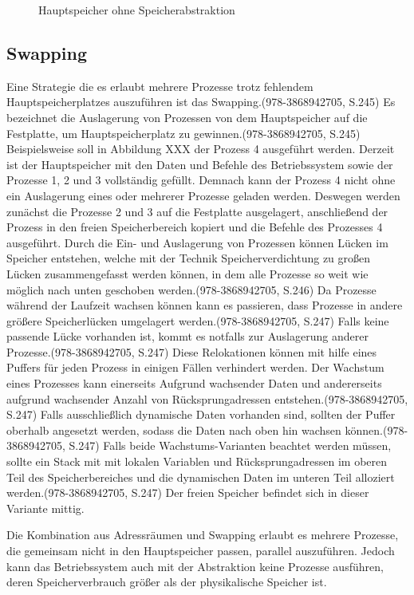 \begin{figure}[htb]
	\centering
	\caption{Hauptspeicher ohne Speicherabstraktion}
\end{figure}

\subsection{Swapping}
\label{subsec:Swapping}
Eine Strategie die es erlaubt mehrere Prozesse trotz fehlendem Hauptspeicherplatzes auszuführen ist das Swapping.(978-3868942705, S.245) Es bezeichnet die Auslagerung von Prozessen von dem Hauptspeicher auf die Festplatte, um Hauptspeicherplatz zu gewinnen.(978-3868942705, S.245) Beispielsweise soll in Abbildung XXX der Prozess 4 ausgeführt werden. Derzeit ist der Hauptspeicher mit den Daten und Befehle des Betriebssystem sowie der Prozesse 1, 2 und 3 vollständig gefüllt. Demnach kann der Prozess 4 nicht ohne ein Auslagerung eines oder mehrerer Prozesse geladen werden. Deswegen werden zunächst die Prozesse 2 und 3 auf die Festplatte ausgelagert, anschließend der Prozess in den freien Speicherbereich kopiert und die Befehle des Prozesses 4 ausgeführt. Durch die Ein- und Auslagerung von Prozessen können Lücken im Speicher entstehen, welche mit der Technik Speicherverdichtung zu großen Lücken zusammengefasst werden können, in dem alle Prozesse so weit wie möglich nach unten geschoben werden.(978-3868942705, S.246) Da Prozesse während der Laufzeit wachsen können kann es passieren, dass Prozesse in andere größere Speicherlücken umgelagert werden.(978-3868942705, S.247) Falls keine passende Lücke vorhanden ist, kommt es notfalls zur Auslagerung anderer Prozesse.(978-3868942705, S.247) Diese Relokationen können mit hilfe eines Puffers für jeden Prozess in einigen Fällen verhindert werden. Der Wachstum eines Prozesses kann einerseits Aufgrund wachsender Daten und andererseits aufgrund wachsender Anzahl von Rücksprungadressen entstehen.(978-3868942705, S.247) Falls ausschließlich dynamische Daten vorhanden sind, sollten der Puffer oberhalb angesetzt werden, sodass die Daten nach oben hin wachsen können.(978-3868942705, S.247) Falls beide Wachstums-Varianten beachtet werden müssen, sollte ein Stack mit mit lokalen Variablen und Rücksprungadressen im oberen Teil des Speicherbereiches und die dynamischen Daten im unteren Teil alloziert werden.(978-3868942705, S.247) Der freien Speicher befindet sich in dieser Variante mittig.

Die Kombination aus Adressräumen und Swapping erlaubt es mehrere Prozesse, die gemeinsam nicht in den Hauptspeicher passen, parallel auszuführen. Jedoch kann das Betriebssystem auch mit der Abstraktion keine Prozesse ausführen, deren Speicherverbrauch größer als der physikalische Speicher ist.

